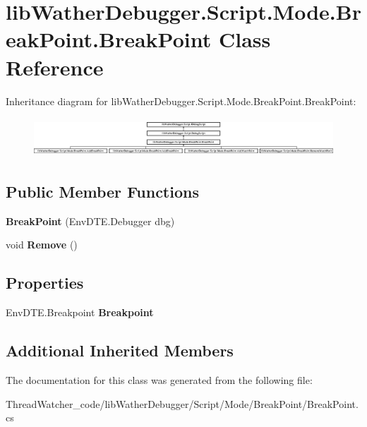 \hypertarget{classlib_wather_debugger_1_1_script_1_1_mode_1_1_break_point_1_1_break_point}{\section{lib\+Wather\+Debugger.\+Script.\+Mode.\+Break\+Point.\+Break\+Point Class Reference}
\label{classlib_wather_debugger_1_1_script_1_1_mode_1_1_break_point_1_1_break_point}
}
Inheritance diagram for lib\+Wather\+Debugger.\+Script.\+Mode.\+Break\+Point.\+Break\+Point\+:\begin{figure}[H]
\begin{center}
\leavevmode
\includegraphics[height=1.477572cm]{classlib_wather_debugger_1_1_script_1_1_mode_1_1_break_point_1_1_break_point}
\end{center}
\end{figure}
\subsection*{Public Member Functions}
\begin{DoxyCompactItemize}
\item 
\hypertarget{classlib_wather_debugger_1_1_script_1_1_mode_1_1_break_point_1_1_break_point_a0410da9157fb25e402202cf1b06062ca}{{\bfseries Break\+Point} (Env\+D\+T\+E.\+Debugger dbg)}\label{classlib_wather_debugger_1_1_script_1_1_mode_1_1_break_point_1_1_break_point_a0410da9157fb25e402202cf1b06062ca}

\item 
\hypertarget{classlib_wather_debugger_1_1_script_1_1_mode_1_1_break_point_1_1_break_point_aba6fe60adfc5ef44528397d39694f63d}{void {\bfseries Remove} ()}\label{classlib_wather_debugger_1_1_script_1_1_mode_1_1_break_point_1_1_break_point_aba6fe60adfc5ef44528397d39694f63d}

\end{DoxyCompactItemize}
\subsection*{Properties}
\begin{DoxyCompactItemize}
\item 
\hypertarget{classlib_wather_debugger_1_1_script_1_1_mode_1_1_break_point_1_1_break_point_a725f6c81759dd563936b6df3d3b12d88}{Env\+D\+T\+E.\+Breakpoint {\bfseries Breakpoint}}\label{classlib_wather_debugger_1_1_script_1_1_mode_1_1_break_point_1_1_break_point_a725f6c81759dd563936b6df3d3b12d88}

\end{DoxyCompactItemize}
\subsection*{Additional Inherited Members}


The documentation for this class was generated from the following file\+:\begin{DoxyCompactItemize}
\item 
Thread\+Watcher\+\_\+code/lib\+Wather\+Debugger/\+Script/\+Mode/\+Break\+Point/Break\+Point.\+cs\end{DoxyCompactItemize}
